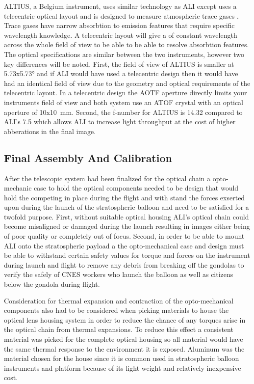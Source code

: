  ALTIUS, a Belgium instrument, uses similar technology as ALI except uses a telecentric optical layout and is designed to measure atmospheric trace gases \citep{Dekemper2012}. Trace gases have narrow absorbtion to emission features that require specific wavelength knowledge. A telecentric layout will give a of constant wavelength across the whole field of view to be able to be able to resolve absorbtion features. The optical specifications are similar between the two instruments, however two key differences will be noted. First, the field of view of ALTIUS is smaller at 5.73x5.73\si{\degree} and if ALI would have used a telecentric design then it would have had an identical field of view due to the geometry and optical requirements of the telecentric layout. In a telecentric design the AOTF aperture directly limits your instruments field of view and both system use an ATOF crystal with an optical aperture of 10x10~mm. Second, the f-number for ALTIUS is 14.32 compared to ALI's 7.5 which allows ALI to increase light throughput at the cost of higher abberations in the final image.

\subsection{Final Assembly And Calibration}

After the telescopic system had been finalized for the optical chain a opto-mechanic case to hold the optical components needed to be design that would hold the competing in place during the flight and with stand the forces exserted upon during the launch of the stratospheric balloon and need to be satisfied for a twofold purpose. First, without suitable optical housing ALI's optical chain could become misaligned or damaged during the launch resulting in images either being of poor quality or completely out of focus. Second, in order to be able to mount ALI onto the stratospheric payload a the opto-mechanical case and design must be able to withstand certain safety values for torque and forces on the instrument during launch and flight to remove any debris from breaking off the gondolas to verify the safely of CNES workers who launch the balloon as well as citizens below the gondola during flight.

Consideration for thermal expansion and contraction of the opto-mechanical components also had to be considered when picking materials to house the optical lens housing system in order to reduce the chance of any torques arise in the optical chain from thermal expansions. To reduce this effect a consistent material was picked for the complete optical housing so all material would have the same thermal response to the environment it is exposed. Aluminum was the material chosen for the house since it is common used in stratospheric balloon instruments and platform because of its light weight and relatively inexpensive cost.


